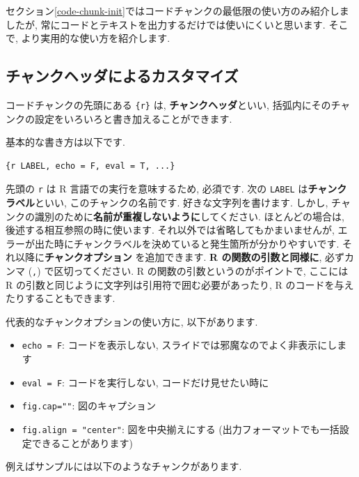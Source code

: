 \documentclass[
]{ltjsarticle}
\providecommand{\tightlist}{%
  \setlength{\itemsep}{0pt}\setlength{\parskip}{0pt}}
\begin{document}
セクション\ref{code-chunk-init}ではコードチャンクの最低限の使い方のみ紹介しましたが, 常にコードとテキストを出力するだけでは使いにくいと思います. そこで, より実用的な使い方を紹介します.

\hypertarget{ux30c1ux30e3ux30f3ux30afux30d8ux30c3ux30c0ux306bux3088ux308bux30abux30b9ux30bfux30deux30a4ux30ba}{%
\subsection{チャンクヘッダによるカスタマイズ}\label{ux30c1ux30e3ux30f3ux30afux30d8ux30c3ux30c0ux306bux3088ux308bux30abux30b9ux30bfux30deux30a4ux30ba}}

コードチャンクの先頭にある \texttt{\{r\}} は, \textbf{チャンクヘッダ}といい, 括弧内にそのチャンクの設定をいろいろと書き加えることができます.

基本的な書き方は以下です.

\begin{verbatim}
{r LABEL, echo = F, eval = T, ...}
\end{verbatim}

先頭の \texttt{r} は R 言語での実行を意味するため, 必須です. 次の \texttt{LABEL} は\textbf{チャンクラベル}といい, このチャンクの名前です. 好きな文字列を書けます. しかし, チャンクの識別のために\textbf{名前が重複しないように}してください. ほとんどの場合は, 後述する相互参照の時に使います. それ以外では省略してもかまいませんが, エラーが出た時にチャンクラベルを決めていると発生箇所が分かりやすいです. それ以降に\textbf{チャンクオプション} を追加できます. \textbf{R の関数の引数と同様に}, 必ずカンマ (\texttt{,}) で区切ってください. R の関数の引数というのがポイントで, ここには R の引数と同じように文字列は引用符で囲む必要があったり, R のコードを与えたりすることもできます.

代表的なチャンクオプションの使い方に, 以下があります.

\begin{itemize}
\tightlist
\item
  \texttt{echo\ =\ F}: コードを表示しない, スライドでは邪魔なのでよく非表示にします
\item
  \texttt{eval\ =\ F}: コードを実行しない, コードだけ見せたい時に
\item
  \texttt{fig.cap=""}: 図のキャプション
\item
  \texttt{fig.align\ =\ "center"}: 図を中央揃えにする (出力フォーマットでも一括設定できることがあります)
\end{itemize}

例えばサンプルには以下のようなチャンクがあります.
\end{document}
